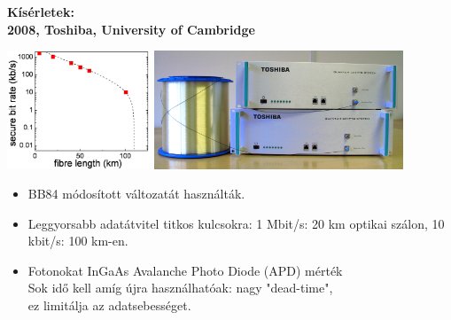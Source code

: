 \documentclass{beamer}
\begin{document}
    \begin{frame}

        \center

        \textbf{Kísérletek:\\
            2008, Toshiba, University of Cambridge}

        \includegraphics[height=100pt]{toshiba_exp_res.jpg}
        \includegraphics[height=100pt]{fiber.jpg}

        \begin{itemize}
            \item BB84 módosított változatát használták.
            \item Leggyorsabb adatátvitel titkos kulcsokra: 1 Mbit/s: 20 km optikai szálon, 10 kbit/s: 100 km-en.
            \item Fotonokat InGaAs Avalanche Photo Diode (APD) mérték\\
                Sok idő kell amíg újra használhatóak: nagy "dead-time",\\
                ez limitálja az adatsebességet.
        \end{itemize}

    \end{frame}
\end{document}
